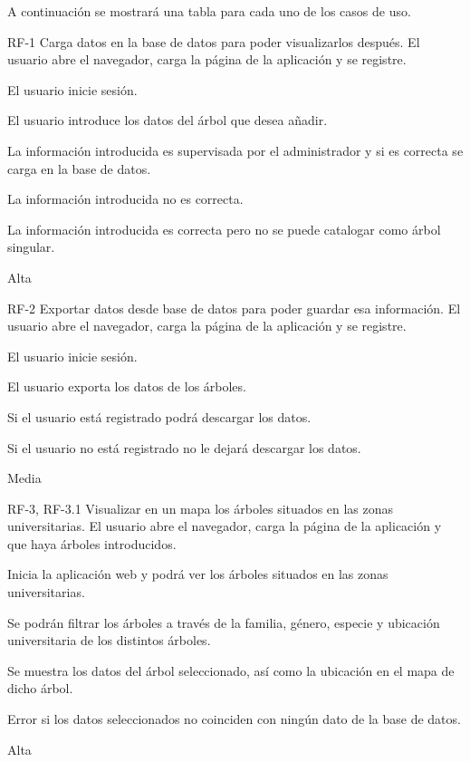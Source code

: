 A continuación se mostrará una tabla para cada uno de los casos de uso.
\newpage


{RF-1}
{Carga datos en la base de datos para poder visualizarlos después.}
{El usuario abre el navegador, carga la página de la aplicación y se registre.}
{
	\item El usuario inicie sesión.
	\item El usuario introduce los datos del árbol que desea añadir.
}
{La información introducida es supervisada por el administrador y si es correcta se carga en la base de datos.}
{
	\item La información introducida no es correcta.
	\item La información introducida es correcta pero no se puede catalogar como árbol singular.
}
{Alta}

\newpage


{RF-2}
{Exportar datos desde base de datos para poder guardar esa información.}
{El usuario abre el navegador, carga la página de la aplicación y se registre.}
{
	\item El usuario inicie sesión.
	\item El usuario exporta los datos de los árboles.
}
{Si el usuario está registrado podrá descargar los datos.}
{
	\item Si el usuario no está registrado no le dejará descargar los datos.
}
{Media}

\newpage


{RF-3, RF-3.1}
{Visualizar en un mapa los árboles situados en las zonas universitarias.}
{El usuario abre el navegador, carga la página de la aplicación y que haya árboles introducidos.}
{
	\item Inicia la aplicación web y podrá ver los árboles situados en las zonas universitarias.
	\item Se podrán filtrar los árboles a través de la familia, género, especie y ubicación universitaria de los distintos árboles.
}
{Se muestra los datos del árbol seleccionado, así como la ubicación en el mapa de dicho árbol.}
{
	\item Error si los datos seleccionados no coinciden con ningún dato de la base de datos.
}
{Alta}

\newpage

